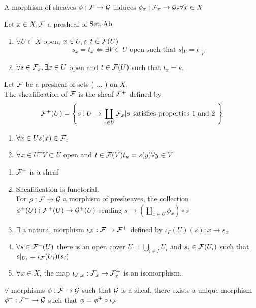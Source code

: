 \documentclass[../main.tex]{subfiles}
\begin{document}
\begin{rmq}
A morphism of sheaves $\phi: \mathcal{F} \to \mathcal{G}$ induces $\phi_x: \mathcal{F}_x\to \mathcal{G}_x \forall x \in X$ 
\end{rmq}
\begin{rmq}
Let $x\in X, \mathcal{F}$ a presheaf of $\operatorname{Set},\operatorname{Ab}$
\begin{enumerate}
\item $\forall U \subset X$ open, $x \in U,s,t\in \mathcal{F}( U) $ 
	\[ 
	s_x = t_x \iff \exists V \subset U \text{ open such that  }  s|_V = t|_V
	\]
	
\item $\forall s \in \mathcal{F}_x, \exists x \in U $ open and $t \in \mathcal{F}( U) $ such that $t_x =s$.
\end{enumerate}
\end{rmq}
\begin{defn}[Sheafification]
	Let $\mathcal{F}$ be a presheaf of sets ( $\ldots$ ) on $X$.\\
	The sheafification of $\mathcal{F}$ is the sheaf $\mathcal{F}^{+}$ defined by
	\[ 
	\mathcal{F}^{+}( U) = \left\{ s: U \to \coprod_{x\in U} \mathcal{F}_x | s \text{ satisfies properties 1 and 2  }  \right\} 
	\]
\begin{enumerate}
\item $\forall x \in U s( x) \in \mathcal{F}_x $ 
\item $\forall x \in U \exists V \subset U$ open and $t\in \mathcal{F}( V) t_u = s( y) \forall y  \in V$ 
\end{enumerate}
\end{defn}
\begin{rmq}
\begin{enumerate}
\item $\mathcal{F}^{+}$ is a sheaf
\item Sheafification is functorial.\\
	For $\rho:\mathcal{F} \to \mathcal{G}$ a morphism of presheaves, the collection $\phi^{+}( U) :\mathcal{F}^{+}( U) \to \mathcal{G}^{+}( U) $ sending $s \to ( \coprod_{x\in U} \phi_x) \circ s$ 
\item $\exists$ a natural morphism $\iota_{\mathcal{F}} : \mathcal{F} \to \mathcal{F}^{+}$ defined by $\iota_F( U) ( s) :x\to s_x$ 
\item $\forall s \in \mathcal{F}^{+}( U) $ there is an open cover $U = \bigcup_{i \in I} U_i$ and $s_i \in \mathcal{F}( U_i) $ such that $s|_{U_i} = \iota_{\mathcal{F}}( U_i) ( s_i) $ 
\item $\forall x \in X$, the map $\iota_{\mathcal{F},x} : \mathcal{F}_x \to \mathcal{F}_x^{+}$ is an isomorphism.
\end{enumerate}
\end{rmq}
\begin{propo}
$\forall$ morphisms $\phi:\mathcal{F} \to \mathcal{G}$ such that $\mathcal{G}$ is a sheaf, there exists a unique morphism $\phi^{+}: \mathcal{F}^{+}\to \mathcal{G}$ such that $\phi= \phi^{+}\circ \iota_{\mathcal{F}}$ 
\end{propo}
\end{document}
